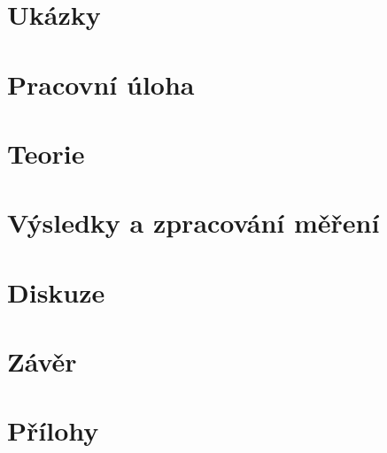 \documentclass{prepareprotokol}
\begin{document}
\maketitle

\section{Ukázky}


\section{Pracovní úloha}
\label{section:uloha}


\section{Teorie}
\label{section:teorie}

\FloatBarrier

\section{Výsledky a zpracování měření}
\label{section:zpracovani}

\FloatBarrier


\section{Diskuze}
\label{section:diskuze}

\FloatBarrier

\section{Závěr}
\label{section:zaver}

\FloatBarrier

\printbibliography

\newpage
\section{Přílohy}
%
\end{document}
